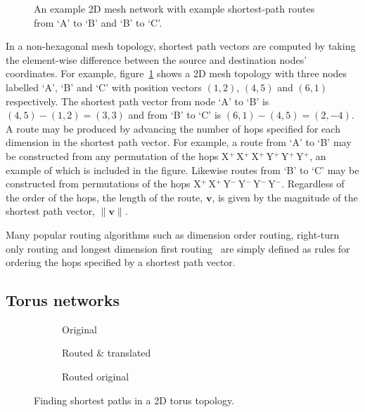 		\begin{figure}
			\center
			\caption[Shortest path routes in a 2D mesh network.]%
			{An example 2D mesh network with example shortest-path routes
			from `A' to `B' and `B' to `C'.}
			\label{fig:mesh-topology-coordinates}
		\end{figure}
		
		In a non-hexagonal mesh topology, shortest path vectors are computed by
		taking the element-wise difference between the source and destination
		nodes' coordinates. For example, figure~\ref{fig:mesh-topology-coordinates}
		shows a 2D mesh topology with three nodes labelled `A', `B' and `C' with
		position vectors $(1, 2)$, $(4, 5)$ and $(6, 1)$ respectively. The shortest
		path vector from node `A' to `B' is $(4, 5) - (1, 2) = (3, 3)$ and from `B'
		to `C' is $(6, 1) - (4, 5) = (2, -4)$. A route may be produced by advancing
		the number of hops specified for each dimension in the shortest path
		vector. For example, a route from `A' to `B' may be constructed from any
		permutation of the hops X$^+\,$X$^+\,$X$^+\,$Y$^+\,$Y$^+\,$Y$^+$, an
		example of which is included in the figure. Likewise routes from `B' to `C'
		may be constructed from permutations of the hops
		X$^+\,$X$^+\,$Y$^-\,$Y$^-\,$Y$^-\,$Y$^-$. Regardless of the order of the
		hops, the length of the route, $\mathbf{v}$, is given by the magnitude of
		the shortest path vector, $\|\mathbf{v}\|$.
		
		Many popular routing algorithms such as dimension order routing, right-turn
		only routing and longest dimension first routing~\cite{davies12} are simply
		defined as rules for ordering the hops specified by a shortest path vector.
		
		\subsection{Torus networks}
			
			\begin{figure}
				\center
				\begin{subfigure}{0.3\linewidth}
					\center
					\caption{Original}
					\label{fig:torus-shortest-path-example}
				\end{subfigure}
				\begin{subfigure}{0.3\linewidth}
					\center
					\caption{Routed \& translated}
					\label{fig:torus-shortest-path-translate}
				\end{subfigure}
				\begin{subfigure}{0.3\linewidth}
					\center
					\caption{Routed original}
					\label{fig:torus-shortest-path-routed}
				\end{subfigure}
				
				\caption{Finding shortest paths in a 2D torus topology.}
				\label{fig:torus-shortest-path}
			\end{figure}
			

